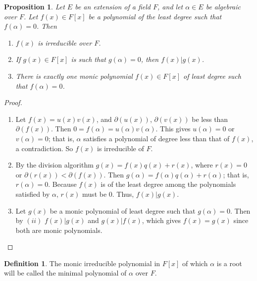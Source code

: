 \documentclass[draft]{article}
\newtheorem{prop}[thm]{Proposition}
\theoremstyle{definition}
\newtheorem{defn}{Definition}[section]
\theoremstyle{remark}
\begin{document}
            \begin{prop}
                Let $E$ be an extension of a field $F$, and let $\alpha \in E$ be algebraic over $F$. Let $f(x) \in F[x]$ be a polynomial of the least degree such that $f(\alpha) = 0$. Then
                \begin{enumerate}
                \renewcommand{\labelenumi}{(\roman{enumi})}
                    \item $f(x)$ is irreducible over $F$.
                    \item If $g(x) \in F[x]$ is such that $g(\alpha) = 0$, then $f(x) | g(x)$.
                    \item There is exactly one monic polynomial $f(x) \in F[x]$ of least degree such that $f(\alpha) = 0$.
                \end{enumerate}
            \end{prop}
            
            \begin{proof}
                \begin{enumerate}
                \renewcommand{\labelenumi}{(\roman{enumi})}
                    \item Let $f(x) = u(x)v(x)$, and $\partial(u(x))$, $\partial(v(x))$ be less than $\partial(f(x))$. Then $0 = f(\alpha) = u(\alpha)v(\alpha)$. This gives $u(\alpha) = 0$ or $v(\alpha) = 0$; that is, $\alpha$ satisfies a polynomial of degree less than that of $f(x)$, a contradiction. So $f(x)$ is irreducible of $F$.
                    \item By the division algorithm $g(x) = f(x)q(x) + r(x)$, where $r(x) = 0$ or $\partial(r(x)) < \partial(f(x))$. Then $g(\alpha) = f(\alpha)q(\alpha) + r(\alpha)$; that is, $r(\alpha) = 0$. Because $f(x)$ is of the least degree among the polynomials satisfied by $\alpha$, $r(x)$ must be 0. Thus, $f(x) | g(x)$.
                    \item Let $g(x)$ be a monic polynomial of least degree such that $g(\alpha) = 0$. Then by $(ii)$ $f(x) | g(x)$ and $g(x) | f(x)$, which gives $f(x) = g(x)$ since both are monic polynomials.
                \end{enumerate}
            \end{proof}
            
            \begin{defn}
                The monic irreducible polynomial in $F[x]$ of which $\alpha$ is a root will be called the minimal polynomial of $\alpha$ over $F$.
            \end{defn}
            
\end{document}
